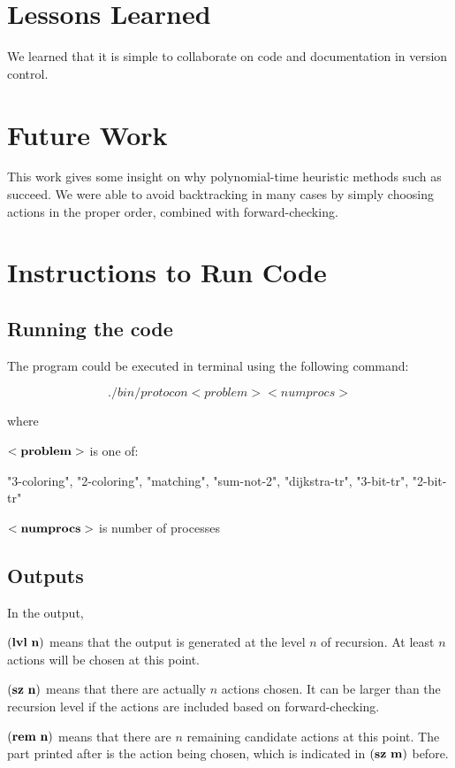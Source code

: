 \section{Lessons Learned}

We learned that it is simple to collaborate on code and documentation in version control.

\section{Future Work}

This work gives some insight on why polynomial-time heuristic methods such as \cite{ipdpsEbnenasir11} succeed.
We were able to avoid backtracking in many cases by simply choosing actions in the proper order, combined with forward-checking.

\section{Instructions to Run Code}
\subsection{Running the code}
The program could be executed in terminal using the following command:

\[
  ./bin/protocon <problem> <numprocs>
\]

where

$\bf{<problem>}$ is one of:

"3-coloring", "2-coloring", "matching", "sum-not-2", "dijkstra-tr", "3-bit-tr", "2-bit-tr"

$\bf{<numprocs>}$ is number of processes

\subsection{Outputs}
In the output, 

$\bf{(lvl\ n)}$ means that the output is generated at the level $n$ of recursion. At least $n$ actions will be chosen at this point.

$\bf{(sz\ n)}$ means that there are actually $n$ actions chosen. It can be larger than the recursion level if the actions are included based on forward-checking.

$\bf{(rem\ n)}$ means that there are $n$ remaining candidate actions at this point. The part printed after is the action being chosen, which is indicated in $\bf{(sz\ m)}$ before. 


